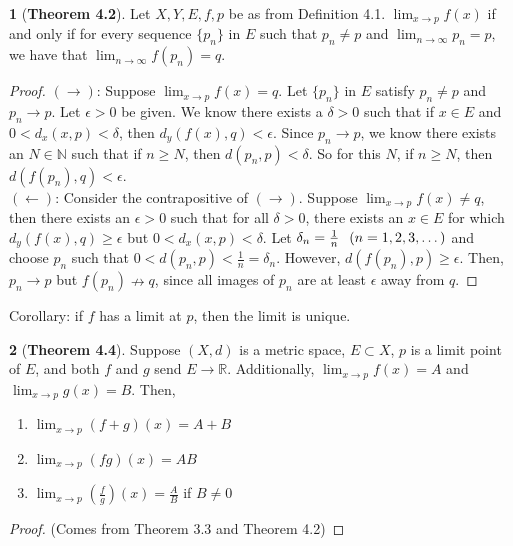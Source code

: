\documentclass[12pt]{article}
\theoremstyle{definition}
\theoremstyle{named}
\newtheorem{theorem}{}
\begin{document}
\begin{theorem}[\textbf{Theorem 4.2}]
    Let $X, Y, E, f, p$ be as from Definition 4.1. $\lim_{x \to p} f(x)$ if and only if for every sequence $\{p_n\}$ in $E$ such that $p_n \neq p$ and $\lim_{n \to \infty} p_n = p$, we have that $\lim_{n \to \infty} f(p_n) = q$. 
\end{theorem}
\begin{proof}
    $(\rightarrow)$: Suppose $\lim_{x \to p} f(x) = q$. Let $\{p_n\}$ in $E$ satisfy $p_n \neq p$ and $p_n \to p$. Let $\epsilon > 0$ be given. We know there exists a $\delta > 0$ such that if $x \in E$ and $0 < d_x(x,p) < \delta$, then $d_y(f(x),q) < \epsilon$. Since $p_n \to p$, we know there exists an $N \in \mathbb{N}$ such that if $n \geq N$, then $d(p_n, p) < \delta$. So for this $N$, if $n \geq N$, then $d(f(p_n), q) < \epsilon$. \\
    $(\leftarrow)$: Consider the contrapositive of $(\rightarrow)$. Suppose $\lim_{x \to p} f(x) \neq q$, then there exists an $\epsilon > 0$ such that for all $\delta > 0$, there exists an $x \in E$ for which $d_y(f(x), q) \geq \epsilon$ but $0 < d_x(x,p) < \delta$. Let $\delta_n = \frac{1}{n} \hspace{0.25cm} (n=1,2,3, \dots)$ and choose $p_n$ such that $0 < d(p_n, p) < \frac{1}{n} = \delta_n$. However, $d(f(p_n), p) \geq \epsilon$. Then, $p_n \to p$ but $f(p_n) \nrightarrow q$, since all images of $p_n$ are at least $\epsilon$ away from $q$. 
\end{proof}

Corollary: if $f$ has a limit at $p$, then the limit is unique. 

\begin{theorem}[\textbf{Theorem 4.4}]
Suppose $(X,d)$ is a metric space, $E \subset X$, $p$ is a limit point of $E$, and both $f$ and $g$ send $E \to \mathbb{R}$. Additionally, $\lim_{x \to p} f(x) = A$ and $\lim_{x \to p} g(x) = B$. Then, 
\begin{enumerate}
    \item $\lim_{x \to p} (f+g)(x) = A + B$
    \item $\lim_{x \to p} (fg)(x) = AB$
    \item $\lim_{x \to p} \left(\frac{f}{g}\right)(x) = \frac{A}{B}$ if $B \neq 0$
\end{enumerate}
\end{theorem}
\begin{proof}
    (Comes from Theorem 3.3 and Theorem 4.2) 
\end{proof}
\end{document}
